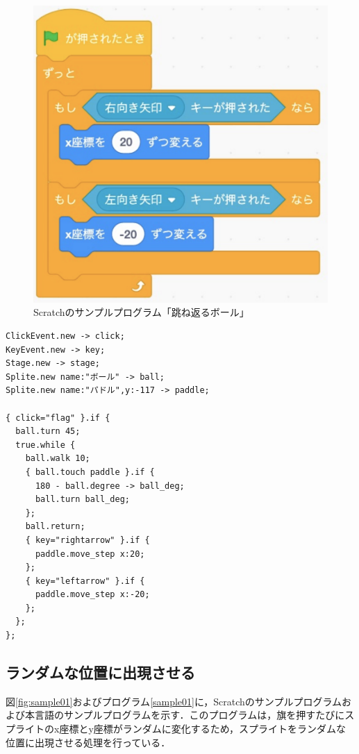 \documentclass[10pt,a4j]{ltjsarticle}
\begin{document}
\begin{figure}[H]
\begin{minipage}[b]{0.5\linewidth}
    \includegraphics[keepaspectratio, scale=0.3]{images/sample05-2.pdf}
  \end{minipage}
  \caption{Scratchのサンプルプログラム「跳ね返るボール」}
  \label{fig:sample05}
\end{figure}

\begin{lstlisting}[caption=本言語のサンプルプログラム「跳ね返るボール」, label=sample05]
ClickEvent.new -> click;
KeyEvent.new -> key;
Stage.new -> stage;
Splite.new name:"ボール" -> ball;
Splite.new name:"パドル",y:-117 -> paddle;

{ click="flag" }.if {
  ball.turn 45;
  true.while {
    ball.walk 10;
    { ball.touch paddle }.if {
      180 - ball.degree -> ball_deg;
      ball.turn ball_deg;
    };
    ball.return;
    { key="rightarrow" }.if {
      paddle.move_step x:20;
    };
    { key="leftarrow" }.if {
      paddle.move_step x:-20;
    };
  };
};
\end{lstlisting}

\subsection{ランダムな位置に出現させる}
図\ref{fig:sample01}およびプログラム\ref{sample01}に，Scratchのサンプルプログラムおよび本言語のサンプルプログラムを示す．このプログラムは，旗を押すたびにスプライトのx座標とy座標がランダムに変化するため，スプライトをランダムな位置に出現させる処理を行っている．
\end{document}
